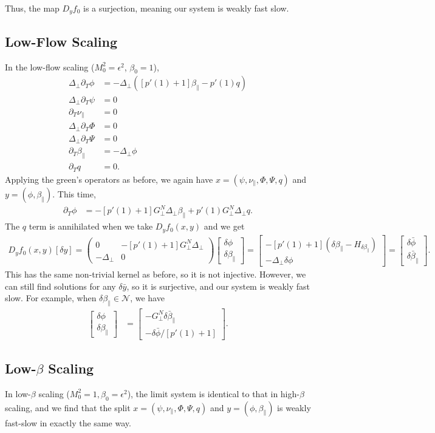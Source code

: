 \documentclass{article}
\newcommand{\para}{\parallel}
\newcommand{\ep}{\epsilon}
\newcommand{\lap}{\Delta_\perp}
\newcommand{\p}{\partial}
\newcommand{\GN}{G_\perp^N}
\newcommand{\pth} [1] {\left( #1 \right) }
\newcommand{\bmat} [1] {\begin{bmatrix} #1 \end{bmatrix}}
\newcommand{\pmat} [1] {\begin{pmatrix} #1 \end{pmatrix}}
\begin{document}
Thus, the map $D_yf_0$ is a surjection, meaning our system is weakly fast slow. 


\subsection{Low-Flow Scaling} \label{lowflow}
In the low-flow scaling ($M_0^2 = \ep^2$, $\beta_0=1$), 
\begin{align}
    \lap\p_T\phi &= -\lap\pth{[p'(1)+1] \beta_\para - p'(1) q} \\ 
    \lap \p_T\psi &= 0 \\ 
    \p_T\nu_\para &= 0 \\ 
    \lap \p_T\Phi &= 0 \\ 
    \lap \p_T\Psi &= 0 \\ 
    \p_T\beta_\para &= -\lap\phi \\ 
    \p_Tq &= 0.
\end{align}
Applying the green's operators as before, we again have $x=(\psi, \nu_\para, \Phi, \Psi, q)$ and $y=(\phi, \beta_\para)$. This time,  
\begin{align}
    \p_T\phi &= -[p'(1)+1] \GN\lap\beta_\para + p'(1) \GN\lap q.
\end{align}
The $q$ term is annihilated when we take $D_yf_0(x,y)$ and we get 
\begin{align}
    D_yf_0(x,y)[\delta y] = \pmat{0 & -[p'(1)+1] \GN \lap \\ -\lap & 0} \bmat{\delta \phi \\ \delta \beta_\para} = \bmat{-[p'(1)+1] \pth{\delta\beta_\para - H_{\delta\beta_\para}} \\ -\lap\delta\phi} = \bmat{\delta \bar{\phi} \\ \delta \bar{\beta}_\para}. 
\end{align}
This has the same non-trivial kernel as before, so it is not injective. However, we can still find solutions for any $\delta\bar{y}$, so it is surjective, and our system is weakly fast slow. For example, when $\delta\beta_\para\in\mathcal{N}$, we have 
\begin{align}
    \bmat{\delta\phi \\ \delta\beta_\para} &= \bmat{-\GN \delta\bar{\beta}_\para \\ -\delta\bar{\phi} / [p'(1)+1]}. 
\end{align}


\subsection{Low-$\beta$ Scaling} \label{lowbeta}
In low-$\beta$ scaling ($M_0^2 = 1, \beta_0 = \ep^2$), the limit system is identical to that in high-$\beta$ scaling, and we find that the split $x=(\psi, \nu_\para, \Phi, \Psi, q)$ and $y=(\phi, \beta_\para)$ is weakly fast-slow in exactly the same way. 
\end{document}
